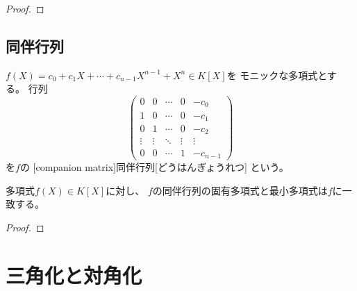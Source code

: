 \documentclass[report]{jlreq}
\begin{document}

\begin{proof}
\end{proof}

\subsection{同伴行列}

\begin{definition}[同伴行列]
    $f(X) = c_0 + c_1 X + \cdots + c_{n-1} X^{n-1} + X^n \in K[X]$を
    モニックな多項式とする。
    行列
    \begin{equation}
        \begin{pmatrix}
            0 & 0 & \cdots & 0 & -c_0 \\
            1 & 0 & \cdots & 0 & -c_1 \\
            0 & 1 & \cdots & 0 & -c_2 \\
            \vdots & \vdots & \ddots & \vdots & \vdots \\
            0 & 0 & \cdots & 1 & -c_{n-1}
        \end{pmatrix}
    \end{equation}
    を$f$の
    [companion matrix]{同伴行列}[どうはんぎょうれつ]
    という。
\end{definition}

\begin{proposition}
    多項式$f(X) \in K[X]$に対し、
    $f$の同伴行列の固有多項式と最小多項式は$f$に一致する。
\end{proposition}

\begin{proof}
    \TODO{}
\end{proof}

%
\section{三角化と対角化}
\end{document}
